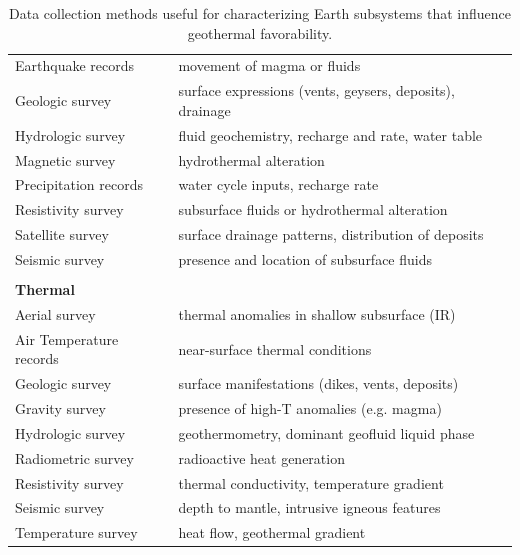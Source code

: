 \begin{table}[!htp]
\begin{tabular}{ll}
Earthquake records      & movement of magma or fluids                              \\
Geologic survey         & surface expressions (vents, geysers, deposits), drainage \\
Hydrologic survey       & fluid geochemistry, recharge and rate, water table       \\
Magnetic survey         & hydrothermal alteration                                  \\
Precipitation records   & water cycle inputs, recharge rate                        \\
Resistivity survey      & subsurface fluids or hydrothermal alteration             \\
Satellite survey        & surface drainage patterns, distribution of deposits      \\
Seismic survey          & presence and location of subsurface fluids               \\
                        &                                                          \\
\textbf{Thermal}        &                                                          \\ \hline
Aerial survey           & thermal anomalies in shallow subsurface (IR)             \\
Air Temperature records & near-surface thermal conditions                          \\
Geologic survey         & surface manifestations (dikes, vents, deposits)          \\
Gravity survey          & presence of high-T anomalies (e.g. magma)                \\
Hydrologic survey       & geothermometry, dominant geofluid liquid phase           \\
Radiometric survey      & radioactive heat generation                              \\
Resistivity survey      & thermal conductivity, temperature gradient               \\
Seismic survey          & depth to mantle, intrusive igneous features              \\
Temperature survey      & heat flow, geothermal gradient                          
\end{tabular}
\caption[Data collection methods for geothermal derisking]{Data collection methods useful for characterizing Earth subsystems that influence geothermal favorability.}
\label{tab:surveytypes}
\end{table}

